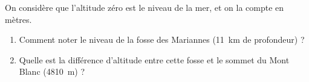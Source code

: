
\begin{exercice}\label{exo2smath-0043}

    On considère que l'altitude zéro est le niveau de la mer, et on la compte en mètres.
    \begin{enumerate}
        \item
            Comment noter le niveau de la fosse des Mariannes (\SI{11}{\kilo\meter} de profondeur) ?
        \item
            Quelle est la différence d'altitude entre cette fosse et le sommet du Mont Blanc (\SI{4810}{\meter}) ?
    \end{enumerate}

\end{exercice}
